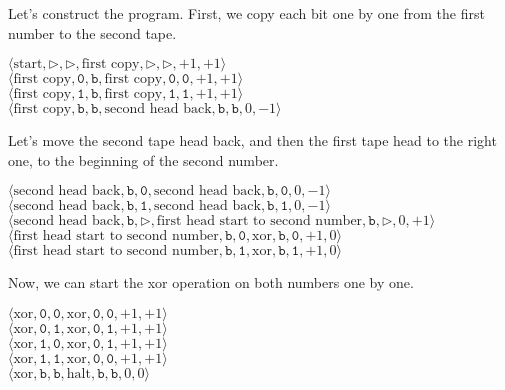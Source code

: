 \documentclass[a4paper,12pt]{article}
\newcommand{\la}{\langle}
\newcommand{\ra}{\rangle}
\begin{document}
    Let's construct the program. First, we copy each bit one by one from the first number to the second tape.
    \begin{center}
        $\la \textrm{start}, \triangleright, \triangleright, \textrm{first copy}, \triangleright, \triangleright, +1, +1 \ra$\\
        $\la \textrm{first copy}, \texttt{0}, \texttt{b}, \textrm{first copy}, \texttt{0}, \texttt{0}, +1, +1 \ra$\\
        $\la \textrm{first copy}, \texttt{1}, \texttt{b}, \textrm{first copy}, \texttt{1}, \texttt{1}, +1, +1 \ra$\\
        $\la \textrm{first copy}, \texttt{b}, \texttt{b}, \textrm{second head back}, \texttt{b}, \texttt{b}, 0, -1 \ra$\\
    \end{center}
    Let's move the second tape head back, and then the first tape head to the right one, to the beginning of the second number.
    \begin{center}
        $\la \textrm{second head back}, \texttt{b}, \texttt{0}, \textrm{second head back}, \texttt{b}, \texttt{0}, 0, -1 \ra$\\
        $\la \textrm{second head back}, \texttt{b}, \texttt{1}, \textrm{second head back}, \texttt{b}, \texttt{1}, 0, -1 \ra$\\
        $\la \textrm{second head back}, \texttt{b}, \triangleright, \textrm{first head start to second number}, \texttt{b}, \triangleright, 0, +1 \ra$\\
        $\la \textrm{first head start to second number}, \texttt{b}, \texttt{0}, \textrm{xor}, \texttt{b}, \texttt{0}, +1, 0 \ra$\\
        $\la \textrm{first head start to second number}, \texttt{b}, \texttt{1}, \textrm{xor}, \texttt{b}, \texttt{1}, +1, 0 \ra$\\
    \end{center}
    Now, we can start the xor operation on both numbers one by one.
    \begin{center}
        $\la \textrm{xor}, \texttt{0}, \texttt{0}, \textrm{xor}, \texttt{0}, \texttt{0}, +1, +1 \ra$\\
        $\la \textrm{xor}, \texttt{0}, \texttt{1}, \textrm{xor}, \texttt{0}, \texttt{1}, +1, +1 \ra$\\
        $\la \textrm{xor}, \texttt{1}, \texttt{0}, \textrm{xor}, \texttt{0}, \texttt{1}, +1, +1 \ra$\\
        $\la \textrm{xor}, \texttt{1}, \texttt{1}, \textrm{xor}, \texttt{0}, \texttt{0}, +1, +1 \ra$\\
        $\la \textrm{xor}, \texttt{b}, \texttt{b}, \textrm{halt}, \texttt{b}, \texttt{b}, 0, 0 \ra$\\
    \end{center}
\end{document}
